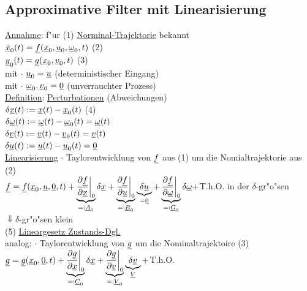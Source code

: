 \documentclass[openany,a4paper,11pt]{book}
\begin{document}
\subsection{Approximative Filter mit Linearisierung}
\uline{Annahme}: f"ur (1) \uline{Norminal-Trajektorie} bekannt\\
\quad $\uline{\dot{x}}_0(t)=\uline{f}(\uline{x}_0,\uline{u}_0,\uline{\omega}_0,t)$ \quad (2)\\
\quad $\uline{y}_0(t)=\uline{g}(\uline{x}_0,\uline{v}_0,t)$ \quad (3)\\
mit $\cdot$ $\uline{u}_0=\uline{u}$ (deterministischer Eingang)\\
{\color{white}mit} $\cdot$ $\uline{\omega}_0,\uline{v}_0=\uline{0}$ (unverrauchter Prozess)\\
\uline{Definition}: \uline{Perturbationen} (Abweichungen)\\
\quad $\delta \uline{x}(t):=\uline{x}(t)-\uline{x}_0(t)$ \quad (4)\\
\quad $\delta \uline{\omega}(t):=\uline{\omega}(t)-\uline{\omega}_0(t)=\uline{\omega}(t)$\\
\quad $\delta \uline{v}(t):=\uline{v}(t)-\uline{v}_0(t)=\uline{v}(t)$\\
\quad $\delta \uline{u}(t):=\uline{u}(t)-\uline{u}_0(t)=\uline{0}$\\
\uline{Linearisierung} $\cdot$ Taylorentwicklung von $\uline{f}$ aus (1) um die Nomialtrajektorie aus (2)\\
$\displaystyle\uline{f}=\uline{f}(\uline{x}_0,\uline{u},\uline{0},t)+\underbrace{\frac{\partial\uline{f}}{\partial\uline{x}}\bigg|_0}_{=:\uline{A}_0}\delta\uline{x}+\underbrace{\frac{\partial\uline{f}}{\partial\uline{u}}\bigg|_0}_{=:\uline{B}_0}\underbrace{\delta\uline{u}}_{=\uline{0}}+\underbrace{\frac{\partial\uline{f}}{\partial\uline{\omega}}\bigg|_0}_{=:\uline{G}_0}\delta\uline{\omega}+$T.h.O. in der $\delta$-gr"o"sen\\
$\Downarrow \delta$-gr"o"sen klein\\
 \quad (5) \uline{Lineargesetz Zustands-Dgl.}\\
analog: $\cdot$ Taylorentwicklung von $\uline{g}$ um die Nominaltrajektoire (3)\\
$\displaystyle\uline{g}=\uline{g}(\uline{x}_0,\uline{0},t)+\underbrace{\frac{\partial\uline{g}}{\partial\uline{x}}\bigg|_0}_{=:\uline{C}_0}\delta\uline{x}+\underbrace{\frac{\partial\uline{g}}{\partial\uline{v}}\bigg|_0}_{=:\uline{V}_0}\underbrace{\delta\uline{v}}_{\uline{V}}+$T.h.O.\\
\end{document}
